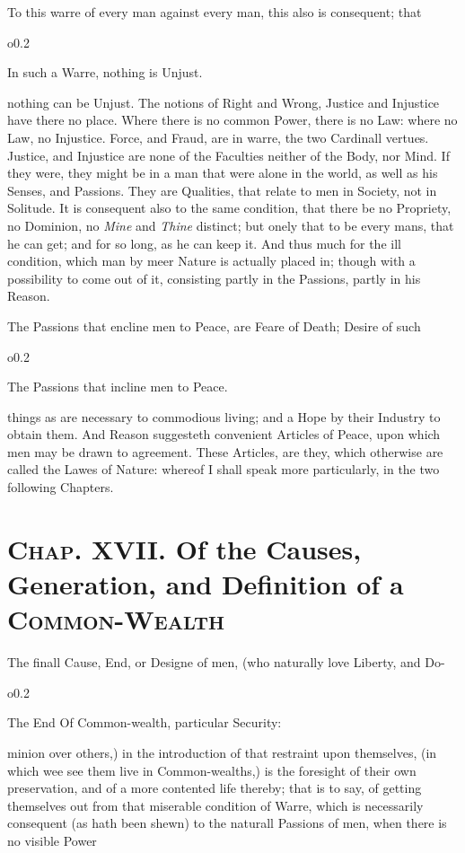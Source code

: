 To this warre of every man against every man, this also is consequent;
that \begin{wrapfigure}[4]{o}{0.2\textwidth}\raggedright In such a
Warre, nothing is Unjust. \end{wrapfigure} nothing can be Unjust. The
notions of Right and Wrong, Justice and Injustice have there no place.
Where there is no common Power, there is no Law: where no Law, no
Injustice. Force, and Fraud, are in warre, the two Cardinall vertues.
Justice, and Injustice are none of the Faculties neither of the Body,
nor Mind. If they were, they might be in a man that were alone in the
world, as well as his Senses, and Passions. They are Qualities, that
relate to men in Society, not in Solitude. It is consequent also to
the same condition, that there be no Propriety, no Dominion, no
\textit{Mine} and \textit{Thine} distinct; but onely that to be every
mans, that he can get; and for so long, as he can keep it. And thus
much for the ill condition, which man by meer Nature is actually
 placed in; though with a possibility to come out of it,
consisting partly in the Passions, partly in his Reason.

The Passions that encline men to Peace, are Feare of Death; Desire of
such \begin{wrapfigure}[4]{o}{0.2\textwidth}\raggedright The Passions
that incline men to Peace. \end{wrapfigure} things as are necessary to
commodious living; and a Hope by their Industry to obtain them. And
Reason suggesteth convenient Articles of Peace, upon which men may be
drawn to agreement. These Articles, are they, which otherwise are
called the Lawes of Nature: whereof I shall speak more particularly,
in the two following Chapters.


\section*{\textsc{Chap}. XVII. Of the Causes, Generation,
and Definition of a \textsc{Common-Wealth}}

The finall Cause, End, or Designe of men, (who naturally love Liberty,
and Do- \begin{wrapfigure}[5]{o}{0.2\textwidth}\raggedright The End Of
Common-wealth, particular Security: \end{wrapfigure} minion over
others,) in the introduction of that restraint upon themselves, (in
which wee see them live in Common-wealths,) is the foresight of their
own preservation, and of a more contented life thereby; that is to
say, of getting themselves out from that miserable condition of Warre,
which is necessarily consequent (as hath been shewn) to the naturall
Passions of men, when there is no visible Power

